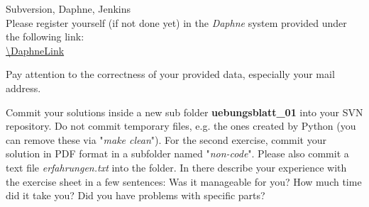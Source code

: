  Subversion, Daphne, Jenkins \\
Please register yourself (if not done yet) in the \textit{Daphne} system provided under the following
link:\\
\url{\DaphneLink}

Pay attention to the correctness of your provided data, especially your mail
address.

Commit your solutions inside a new sub folder
\textbf{uebungsblatt\_01} into your SVN repository. Do not commit temporary files, e.g. the ones created by Python (you can remove these via "\textit{make clean}").
For the second exercise, commit your solution in PDF format in a subfolder named "\textit{non-code}".
Please also commit a text file \textit{erfahrungen.txt} into the folder. In there describe your experience with the exercise sheet in a few sentences:
Was it manageable for you?
How much time did it take you?
Did you have problems with specific parts?
